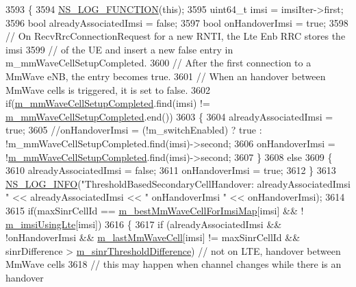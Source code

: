 \begin{DoxyCode}
3593 \{
3594   \hyperlink{log-macros-disabled_8h_a90b90d5bad1f39cb1b64923ea94c0761}{NS\_LOG\_FUNCTION}(\textcolor{keyword}{this});
3595         uint64\_t imsi = imsiIter->first;
3596   \textcolor{keywordtype}{bool} alreadyAssociatedImsi = \textcolor{keyword}{false};
3597   \textcolor{keywordtype}{bool} onHandoverImsi = \textcolor{keyword}{true};
3598   \textcolor{comment}{// On RecvRrcConnectionRequest for a new RNTI, the Lte Enb RRC stores the imsi}
3599   \textcolor{comment}{// of the UE and insert a new false entry in m\_mmWaveCellSetupCompleted.}
3600   \textcolor{comment}{// After the first connection to a MmWave eNB, the entry becomes true.}
3601   \textcolor{comment}{// When an handover between MmWave cells is triggered, it is set to false.}
3602   \textcolor{keywordflow}{if}(\hyperlink{classns3_1_1LteEnbRrc_ad19d6f4c123115e1d13e34609781ab20}{m\_mmWaveCellSetupCompleted}.find(imsi) != 
      \hyperlink{classns3_1_1LteEnbRrc_ad19d6f4c123115e1d13e34609781ab20}{m\_mmWaveCellSetupCompleted}.end())
3603   \{
3604     alreadyAssociatedImsi = \textcolor{keyword}{true};
3605     \textcolor{comment}{//onHandoverImsi = (!m\_switchEnabled) ? true : !m\_mmWaveCellSetupCompleted.find(imsi)->second;}
3606     onHandoverImsi = !\hyperlink{classns3_1_1LteEnbRrc_ad19d6f4c123115e1d13e34609781ab20}{m\_mmWaveCellSetupCompleted}.find(imsi)->second;
3607   \}
3608   \textcolor{keywordflow}{else}
3609   \{
3610     alreadyAssociatedImsi = \textcolor{keyword}{false};
3611     onHandoverImsi = \textcolor{keyword}{true};
3612   \}
3613   \hyperlink{group__logging_gafbd73ee2cf9f26b319f49086d8e860fb}{NS\_LOG\_INFO}(\textcolor{stringliteral}{"ThresholdBasedSecondaryCellHandover: alreadyAssociatedImsi "} << 
      alreadyAssociatedImsi << \textcolor{stringliteral}{" onHandoverImsi "} << onHandoverImsi);
3614 
3615   \textcolor{keywordflow}{if}(maxSinrCellId == \hyperlink{classns3_1_1LteEnbRrc_a38d5bf3d53b16596824f07d4b4a1eab7}{m\_bestMmWaveCellForImsiMap}[imsi] && !
      \hyperlink{classns3_1_1LteEnbRrc_a99427e888b10d095491e72bf062511db}{m\_imsiUsingLte}[imsi])
3616   \{
3617     \textcolor{keywordflow}{if} (alreadyAssociatedImsi && !onHandoverImsi && \hyperlink{classns3_1_1LteEnbRrc_a0d7b04f0383b0dc3f6a7360b87cbaeee}{m\_lastMmWaveCell}[imsi] != maxSinrCellId
       && sinrDifference > \hyperlink{classns3_1_1LteEnbRrc_aef56a65c644f6ed3c5f28a540ded624f}{m\_sinrThresholdDifference}) \textcolor{comment}{// not on LTE, handover between
       MmWave cells}
3618     \textcolor{comment}{// this may happen when channel changes while there is an handover}

\end{DoxyCode}
